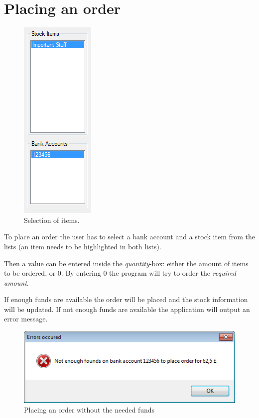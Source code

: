 \section{Placing an order}
\label{sec:placing_order}

\begin{figure} %
\centering
\includegraphics[scale=0.6]{gfx/highlighted_items.png}
\caption{Selection of items.}
\label{fig:highlighted_items}
\end{figure}

To place an order the user has to select a bank account and a stock item from the lists (an item needs to be highlighted in both lists).

Then a value can be entered inside the \textit{quantity}-box: either the amount of items to be ordered, or 0. By entering 0 the program will try to order the \textit{required amount}.

If enough funds are available the order will be placed and the stock information will be updated.
If not enough funds are available the application will output an error message.

\begin{figure}[H]
\begin{center}
\includegraphics[scale=0.8]{gfx/not_enough_funds.png}
\caption{Placing an order without the needed funds}
\label{fig:not_enough_funds}
\end{center}
\end{figure}


